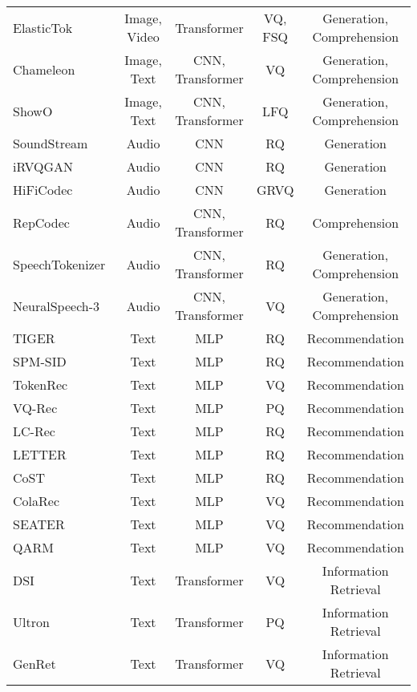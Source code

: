 \begin{table*}[h!]
{\begin{tabular}{l|c|c|c|c}
ElasticTok~\cite{yan2024elastictok} & Image, Video & Transformer & VQ, FSQ & Generation, Comprehension \\
Chameleon~\cite{team2024chameleon} & Image, Text & CNN, Transformer & VQ & Generation, Comprehension \\
ShowO~\cite{xie2024show} & Image, Text & CNN, Transformer & LFQ & Generation, Comprehension \\
SoundStream~\cite{zeghidour2021soundstream} & Audio & CNN & RQ & Generation \\
iRVQGAN~\cite{kumar2024improvedRVQGAN} & Audio & CNN & RQ & Generation \\
HiFiCodec~\cite{yang2023hificodec} & Audio & CNN & GRVQ & Generation \\
RepCodec~\cite{huang2023repcodec} & Audio & CNN, Transformer & RQ & Comprehension \\
SpeechTokenizer~\cite{zhang2023speechtokenizer} & Audio & CNN, Transformer & RQ & Generation, Comprehension \\
NeuralSpeech-3~\cite{ju2024naturalspeech} & Audio & CNN, Transformer & VQ & Generation, Comprehension \\
TIGER~\cite{rajput2023tiger} & Text & MLP & RQ & Recommendation \\
SPM-SID~\cite{singh2024better} & Text & MLP & RQ & Recommendation \\
TokenRec~\cite{qu2024tokenrec} & Text & MLP & VQ & Recommendation \\
VQ-Rec~\cite{hou2023learning} & Text & MLP & PQ & Recommendation \\
LC-Rec~\cite{zheng2024adapting} & Text & MLP & RQ & Recommendation \\
LETTER~\cite{wang2024learnable} & Text & MLP & RQ & Recommendation \\
CoST~\cite{zhu2024cost} & Text & MLP & RQ & Recommendation \\ 
ColaRec~\cite{wang2024content} & Text & MLP & VQ & Recommendation \\
SEATER~\cite{si2024generative} & Text & MLP & VQ & Recommendation \\
QARM~\cite{luo2024qarm} & Text & MLP & VQ & Recommendation  \\
DSI~\cite{tay2022transformer} & Text & Transformer & VQ & Information Retrieval \\
Ultron~\cite{zhou2022ultron} & Text & Transformer & PQ & Information Retrieval \\
GenRet~\cite{sun2024learning} & Text & Transformer & VQ & Information Retrieval \\

\end{tabular}}
\end{table*}
